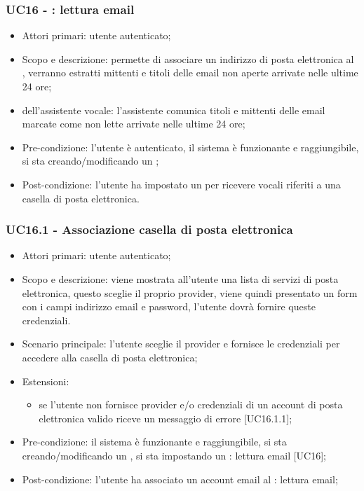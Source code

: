 \subsubsection{UC16 - : lettura email}
\begin{itemize}
	\item  Attori primari: utente autenticato;
	\item  Scopo e descrizione: permette di associare un indirizzo di posta elettronica al , verranno estratti mittenti e titoli delle email non aperte arrivate nelle ultime 24 ore;
	\item  {} dell'assistente vocale: l'assistente comunica titoli e mittenti delle email marcate come non lette arrivate nelle ultime 24 ore;
	\item  Pre-condizione: l'utente è autenticato, il sistema è funzionante e raggiungibile, si sta creando/modificando un ;
	\item  Post-condizione: l'utente ha impostato un  per ricevere  vocali riferiti a una casella di posta elettronica.
\end{itemize}
\subsubsection{UC16.1 - Associazione casella di posta elettronica}
\begin{itemize}
	\item  Attori primari: utente autenticato;
	\item  Scopo e descrizione: viene mostrata all'utente una lista di servizi di posta elettronica, questo sceglie il proprio provider, viene quindi presentato un form con i campi indirizzo email e password, l'utente dovrà fornire queste credenziali.
	\item  Scenario principale: l'utente sceglie il provider e fornisce le credenziali per accedere alla casella di posta elettronica;
	\item  Estensioni:
		   \begin{itemize}
				\item  se l'utente non fornisce provider e/o credenziali di un account di posta elettronica valido riceve un messaggio di errore [UC16.1.1];
		   \end{itemize}
	\item  Pre-condizione: il sistema è funzionante e raggiungibile, si sta creando/modificando un , si sta impostando un : lettura email [UC16];
	\item  Post-condizione: l'utente ha associato un account email al : lettura email;
\end{itemize}
